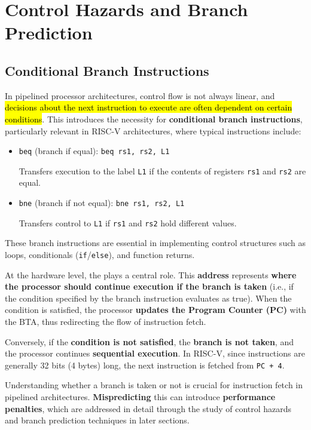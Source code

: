 \section{Control Hazards and Branch Prediction}\label{section: Control Hazards and Branch Prediction}

\subsection{Conditional Branch Instructions}

In pipelined processor architectures, control flow is not always linear, and \hl{decisions about the next instruction to execute are often dependent on certain conditions}. This introduces the necessity for \textbf{conditional branch instructions}, particularly relevant in RISC-V architectures, where typical instructions include:
\begin{itemize}
    \item \texttt{beq} (branch if equal): \texttt{beq rs1, rs2, L1}

    Transfers execution to the label \texttt{L1} if the contents of registers \texttt{rs1} and \texttt{rs2} are equal.

    \item \texttt{bne} (branch if not equal): \texttt{bne rs1, rs2, L1}
    
    Transfers control to \texttt{L1} if \texttt{rs1} and \texttt{rs2} hold different values.
\end{itemize}
These branch instructions are essential in implementing control structures such as loops, conditionals (\texttt{if}/\texttt{else}), and function returns.

\highspace
At the hardware level, the  plays a central role. This \textbf{address} represents \textbf{where the processor should continue execution if the branch is taken} (i.e., if the condition specified by the branch instruction evaluates as true). When the condition is satisfied, the processor \textbf{updates the Program Counter (PC)} with the BTA, thus redirecting the flow of instruction fetch.

\highspace
Conversely, if the \textbf{condition is not satisfied}, the \textbf{branch is not taken}, and the processor continues \textbf{sequential execution}. In RISC-V, since instructions are generally 32 bits (4 bytes) long, the next instruction is fetched from \texttt{PC + 4}.

\highspace
Understanding whether a branch is taken or not is crucial for instruction fetch in pipelined architectures. \textbf{Mispredicting} this can introduce \textbf{performance penalties}, which are addressed in detail through the study of control hazards and branch prediction techniques in later sections.

